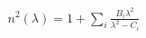 \documentclass[preview]{standalone}
\begin{document}
\begin{align*}
n^2(\lambda) = 1 + \sum_i \frac{B_i \lambda^2}{\lambda^2 - C_i}
\end{align*}
\end{document}
